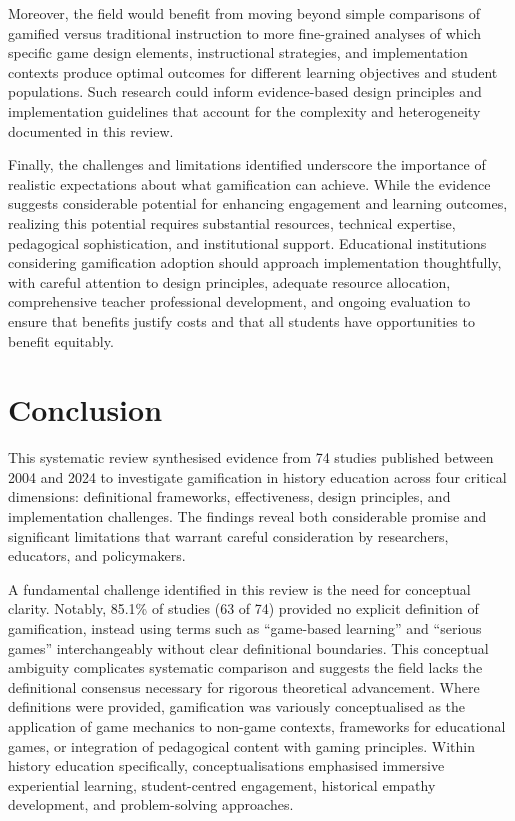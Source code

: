 \documentclass[a4paper,fleqn]{cas-sc}
\begin{document}
Moreover, the field would benefit from moving beyond simple comparisons of gamified versus traditional instruction to more fine-grained analyses of which specific game design elements, instructional strategies, and implementation contexts produce optimal outcomes for different learning objectives and student populations. Such research could inform evidence-based design principles and implementation guidelines that account for the complexity and heterogeneity documented in this review.

Finally, the challenges and limitations identified underscore the importance of realistic expectations about what gamification can achieve. While the evidence suggests considerable potential for enhancing engagement and learning outcomes, realizing this potential requires substantial resources, technical expertise, pedagogical sophistication, and institutional support. Educational institutions considering gamification adoption should approach implementation thoughtfully, with careful attention to design principles, adequate resource allocation, comprehensive teacher professional development, and ongoing evaluation to ensure that benefits justify costs and that all students have opportunities to benefit equitably.

\section{Conclusion}
\label{sec:Conclusion}


This systematic review synthesised evidence from 74 studies published between 2004 and 2024 to investigate gamification in history education across four critical dimensions: definitional frameworks, effectiveness, design principles, and implementation challenges. The findings reveal both considerable promise and significant limitations that warrant careful consideration by researchers, educators, and policymakers.

A fundamental challenge identified in this review is the need for conceptual clarity. Notably, 85.1\% of studies (63 of 74) provided no explicit definition of gamification, instead using terms such as ``game-based learning'' and ``serious games'' interchangeably without clear definitional boundaries. This conceptual ambiguity complicates systematic comparison and suggests the field lacks the definitional consensus necessary for rigorous theoretical advancement. Where definitions were provided, gamification was variously conceptualised as the application of game mechanics to non-game contexts, frameworks for educational games, or integration of pedagogical content with gaming principles. Within history education specifically, conceptualisations emphasised immersive experiential learning, student-centred engagement, historical empathy development, and problem-solving approaches.
\end{document}
